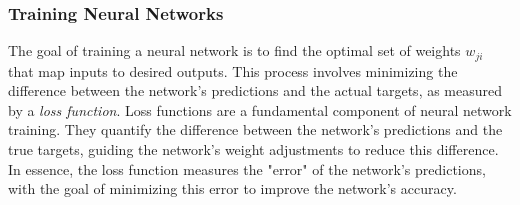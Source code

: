\subsubsection*{Training Neural Networks}
The goal of training a neural network is to find the optimal set of weights $w_{ji}$ that map inputs to desired outputs. This process involves minimizing the difference between the network’s predictions and the actual targets, as measured by a \textit{loss function}.
Loss functions are a fundamental component of neural network training. They quantify the difference between the network's predictions and the true targets, guiding the network’s weight adjustments to reduce this difference. In essence, the loss function measures the "error" of the network's predictions, with the goal of minimizing this error to improve the network's accuracy.

